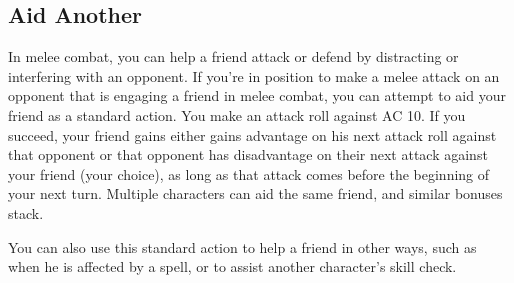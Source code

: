 \subsection{Aid Another}
In melee combat, you can help a friend attack or defend by distracting or interfering with an opponent. If you're in position to make a melee attack on an opponent that is engaging a friend in melee combat, you can attempt to aid your friend as a standard action. You make an attack roll against AC 10. If you succeed, your friend gains either gains advantage on his next attack roll against that opponent or that opponent has disadvantage on their next attack against your friend (your choice), as long as that attack comes before the beginning of your next turn. Multiple characters can aid the same friend, and similar bonuses stack.

You can also use this standard action to help a friend in other ways, such as when he is affected by a spell, or to assist another character's skill check.